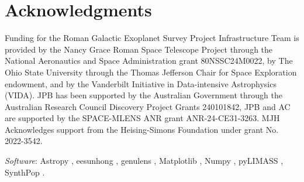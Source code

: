 \documentclass[twocolumn]{aastex631}
\begin{document}
\section*{Acknowledgments}
\noindent Funding for the Roman Galactic Exoplanet Survey Project Infrastructure Team is provided by the Nancy Grace Roman Space Telescope Project through the National Aeronautics and Space Administration grant 80NSSC24M0022, by The Ohio State University through the Thomas Jefferson Chair for Space Exploration endowment, and by the Vanderbilt Initiative in Data-intensive Astrophysics (VIDA). JPB has been supported by the Australian
Government through the Australian Research Council Discovery Project Grants 240101842, JPB and AC are supported by the SPACE-MLENS ANR grant ANR-24-CE31-3263. MJH Acknowledges support from the Heising-Simons Foundation under grant No. 2022-3542.


\noindent \textit{Software}: Astropy \citep{robitaille:2013a}, eesunhong \citep{bennett:1996a}, genulens \citep{koshimoto:code}, Matplotlib \citep{hunter:2007a}, Numpy \citep{oliphant:2006a}, pyLIMASS \citep{bachelet:2024a}, SynthPop \citep{kluter:2025a}.



\end{document}
